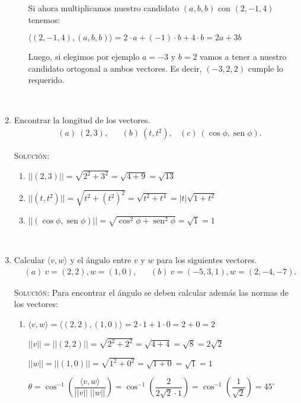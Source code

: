 \documentclass[a4paper,12pt,twoside,spanish,reqno]{amsbook}
\numberwithin{equation}{section}
\newcommand{\rta}{\noindent\textsc{Solución: }}
\begin{document}
\begin{enumerate}
\begin{enumerate}
Si ahora multiplicamos nuestro candidato $(a,b,b)$ con $(2,-1,4)$ tenemos:

$\langle (2,-1,4) , (a,b,b) \rangle = 2 \cdot a + (-1) \cdot b + 4 \cdot b = \boxed{2a + 3 b}$

Luego, si elegimos por ejemplo $a=-3$ y $b=2$ vamos a tener a nuestro candidato ortogonal a ambos vectores. Es decir, $(-3,2,2)$ cumple lo requerido.
\end{enumerate}

\

\item Encontrar la longitud de los vectores.
\begin{align*}
&(a) \ (2,3), && (b) \ (t,t^2), & (c) \ (\cos\phi,\operatorname{sen}\phi).
\end{align*}

\rta 

\begin{enumerate}
\item $||(2,3)|| = \sqrt{2^2 + 3^2} = \sqrt{4+9} = \boxed{\sqrt{13}}$

\item $||(t,t^2)|| = \sqrt{t^2 + (t^2)^2} = \sqrt{t^2+t^4} = \boxed{|t|\sqrt{1+t^2}}$

\item $||(\cos\phi,\operatorname{sen}\phi)|| = \sqrt{\cos^2\phi + \operatorname{sen}^2\phi} = \sqrt{1} = \boxed{1}$
\end{enumerate}

\

\item Calcular $\langle v , w  \rangle$ y el {\'a}ngulo entre $v$ y $w$  para los siguientes vectores.
\begin{align*}
&(a) \ v=(2,2), w=(1,0), &&  (b) \  v=(-5,3,1), w=(2,-4,-7).
\end{align*}

\rta Para encontrar el ángulo se deben calcular además las normas de los vectores:

\begin{enumerate}
\item $\langle v , w  \rangle = \langle (2,2) , (1,0)  \rangle = 2 \cdot 1 + 1 \cdot 0 = 2 + 0 = \boxed{2}$

$||v||=||(2,2)|| = \sqrt{2^2 + 2^2} = \sqrt{4+4} = \sqrt{8} = 2 \sqrt{2}$

$||w||=||(1,0)|| = \sqrt{1^2 + 0 ^2} = \sqrt{1+0} = \sqrt{1} = 1 $

$\theta = \cos^{-1} \left( \dfrac{\langle v,w \rangle}{||v|| \; ||w||} \right) = \cos^{-1} \left( \dfrac{ 2 }{2\sqrt{2} \cdot 1 } \right) = \cos^{-1} \left( \dfrac{ 1 }{\sqrt{2}} \right) = \boxed{45^\circ}$


\end{enumerate}
\end{enumerate}
\end{document}
